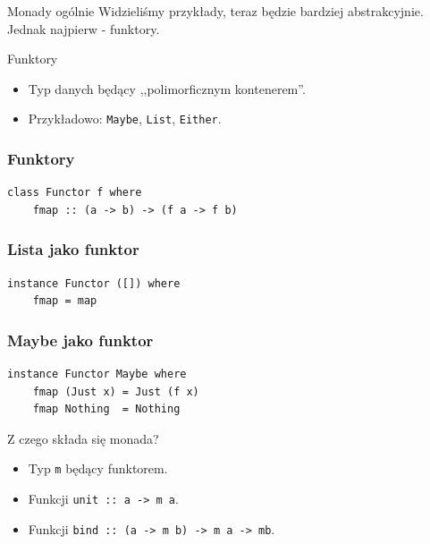 \documentclass[14pt]{beamer}
\begin{document}

\begin{frame}{Monady ogólnie}
    Widzieliśmy przykłady, teraz będzie bardziej abstrakcyjnie.
    Jednak najpierw - funktory.
\end{frame}

\begin{frame}{Funktory}
    \begin{itemize}
        \item Typ danych będący ,,polimorficznym kontenerem''.
        \item Przykładowo: \texttt{Maybe}, \texttt{List}, \texttt{Either}.
    \end{itemize}
\end{frame}

\begin{frame}[fragile]
\frametitle{Funktory}
\begin{verbatim}
class Functor f where
    fmap :: (a -> b) -> (f a -> f b)
\end{verbatim}
\end{frame}

\begin{frame}[fragile]
\frametitle{Lista jako funktor}
\begin{verbatim}
instance Functor ([]) where
    fmap = map
\end{verbatim}
\end{frame}

\begin{frame}[fragile]
\frametitle{Maybe jako funktor}
\begin{verbatim}
instance Functor Maybe where
    fmap (Just x) = Just (f x)
    fmap Nothing  = Nothing
\end{verbatim}
\end{frame}

\begin{frame}{Z czego składa się monada?}
    \begin{itemize}
        \item Typ \texttt{m} będący funktorem.
        \item Funkcji \texttt{unit :: a -> m a}.
        \item Funkcji \texttt{bind :: (a -> m b) -> m a -> mb}.
    \end{itemize}
\end{frame}
\end{document}
